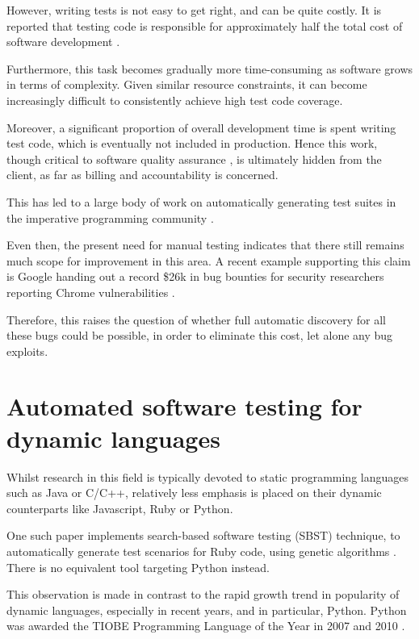 \documentclass{icldt}
\numberwithin{equation}{section}       %
\begin{document}
However, writing tests is not easy to get right, and can be quite costly. It is reported that testing code is responsible for approximately half the total cost of software development \cite{Edvardsson99asurvey}\cite{Han2008}\cite{Korel2005}.

Furthermore, this task becomes gradually more time-consuming as software grows in terms of complexity. Given similar resource constraints, it can become increasingly difficult to consistently achieve high test code coverage.

Moreover, a significant proportion of overall development time is spent writing test code, which is eventually not included in production. Hence this work, though critical to software quality assurance \cite{Harrold00}, is ultimately hidden from the client, as far as billing and accountability is concerned.

This has led to a large body of work on automatically generating test suites in the imperative programming community \cite{Allwood2011}.

Even then, the present need for manual testing indicates that there still remains much scope for improvement in this area. A recent example supporting this claim is Google handing out a record \$26k in bug bounties for security researchers reporting Chrome vulnerabilities \cite{ChromeBugBounties}.

Therefore, this raises the question of whether full automatic discovery \cite{Bertolino2007} for all these bugs could be possible, in order to eliminate this cost, let alone any bug exploits.
\section{Automated software testing for dynamic languages}
Whilst research in this field is typically devoted to static programming languages such as Java or C/C++, relatively less emphasis is placed on their dynamic counterparts like Javascript, Ruby or Python.

One such paper implements search-based software testing (SBST) technique, to automatically generate test scenarios for Ruby code, using genetic algorithms \cite{Mairhofer2011}. There is no equivalent tool targeting Python instead.

This observation is made in contrast to the rapid growth trend in popularity of dynamic languages, especially in recent years, and in particular, Python. Python was awarded the TIOBE Programming Language of the Year in 2007 and 2010 \cite{TiobeDec11}.
\end{document}
